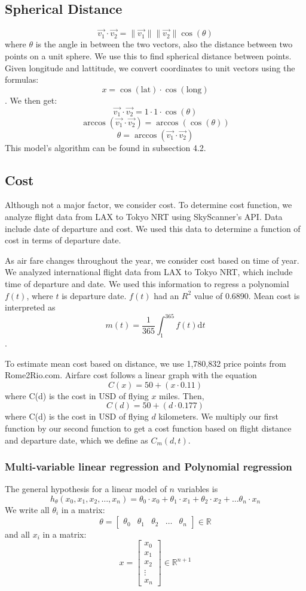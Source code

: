 \subsection{Spherical Distance}
$$\vec{v_1} \cdot \vec{v_2} = \|\vec{v_1}\| \|\vec{v_2}\| \cos(\theta)$$
where $\theta$ is the angle in between the two vectors, also the distance between two points on a unit sphere. We use this to find spherical distance between points. Given longitude and lattitude, we convert coordinates to unit vectors using the formulas:
$$x = \cos(\mathrm{lat}) \cdot \cos(\mathrm{long})$$. We then get:
$$\vec{v_1} \cdot \vec{v_2} = 1 \cdot 1 \cdot \cos(\theta)$$
$$\arccos({\vec{v_1} \cdot \vec{v_2}}) = \arccos(\cos(\theta))$$
$$\theta = \arccos(\vec{v_1} \cdot \vec{v_2})$$
This model's algorithm can be found in subsection 4.2.

\subsection{Cost}
Although not a major factor, we consider cost. To determine cost function, we analyze flight data from LAX to Tokyo NRT using SkyScanner's API. Data include date of departure and cost. We used this data to determine a function of cost in terms of departure date.




As air fare changes throughout the year, we consider cost based on time of year. We analyzed international flight data from LAX to Tokyo NRT, which include time of departure and date. We used this information to regress a polynomial $f(t)$, where $t$ is departure date. $f(t)$ had an $R^2$ value of 0.6890. Mean cost is interpreted as
$$m(t) = \frac{1}{365} \int_1^{365}f(t) \mathrm{d} t $$. 


To estimate mean cost based on distance, we use 1,780,832 price points from Rome2Rio.com. Airfare cost follows a linear graph with the equation $$C(x) = 50 + (x \cdot 0.11)$$ where C(d) is the cost in USD of flying $x$ miles. Then, $$C(d) = 50 + (d \cdot  0.177)$$ where C(d) is the cost in USD of flying $d$ kilometers. 
We multiply our first function by our second function to get a cost function based on flight distance and departure date, which we define as $C_m(d,t)$.

\subsubsection{Multi-variable linear regression and Polynomial regression}
The general hypothesis for a linear model of $n$ variables is
$$h_{\theta}(x_0, x_1, x_2, \dots, x_n) = \theta_0 \cdot x_0 + \theta_1 \cdot x_1 + \theta_2 \cdot x_2 + \dots  \theta_n \cdot x_n$$
We write all $\theta_i$ in a matrix:
$$
\theta = 
\begin{bmatrix}
\theta_0 & \theta_1 & \theta_2 & \dots & \theta_n 
\end{bmatrix}
\in \mathbb{R}
$$
and all $x_i$ in a matrix:
$$
x = 
\begin{bmatrix}
x_0 \\
x_1 \\
x_2 \\
\vdots\\
x_n
\end{bmatrix}
\in {\mathbb{R}}^{n+1}
$$

